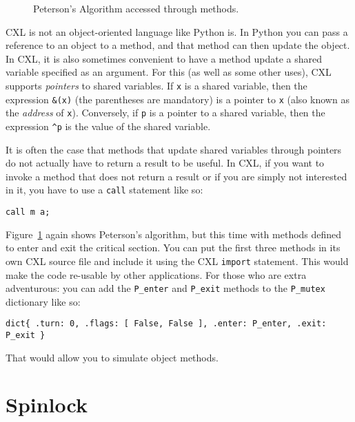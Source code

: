 \documentclass{report}
\newenvironment{code}{
\tcolorbox
}{
\endtcolorbox
}
\begin{document}
\begin{figure}
\begin{code}
\end{code}
\caption{Peterson's Algorithm accessed through methods.}
\label{fig:petersonmethods}
\end{figure}

CXL is not an object-oriented language like Python is.  In Python
you can pass a reference to an object to a method, and that method
can then update the object.  In CXL, it is also sometimes convenient
to have a method update a shared variable specified as an argument.
For this (as well as some other uses), CXL supports \emph{pointers}
to shared variables.
If \texttt{x} is a shared variable, then the expression \texttt{\&(x)}
(the parentheses are mandatory) is a pointer to \texttt{x}
(also known as the \emph{address} of \texttt{x}).
Conversely, if \texttt{p} is a pointer to a shared variable, then the
expression \texttt{\^{}p} is the value of the shared variable.

It is often the case that methods that update shared variables through
pointers do not actually have to return a result to be useful.
In CXL, if you want to invoke a method that does not return a result
or if you are simply not interested in it,
you have to use a \texttt{call} statement like so:
\begin{code}
\begin{verbatim}
call m a;
\end{verbatim}
\end{code}

Figure~\ref{fig:petersonmethods} again shows Peterson's algorithm,
but this time with methods defined to enter and exit the critical
section.
You can put the first three methods in its own CXL source file
and include it using the CXL \texttt{import} statement.  This would
make the code re-usable by other applications.  For those who are
extra adventurous: you can add the \texttt{P\_enter} and
\texttt{P\_exit} methods to the \texttt{P\_mutex} dictionary
like so:
\begin{code}
\begin{verbatim}
dict{ .turn: 0, .flags: [ False, False ], .enter: P_enter, .exit: P_exit }
\end{verbatim}
\end{code}
That would allow you to simulate object methods.

\chapter{Spinlock}
\end{document}
